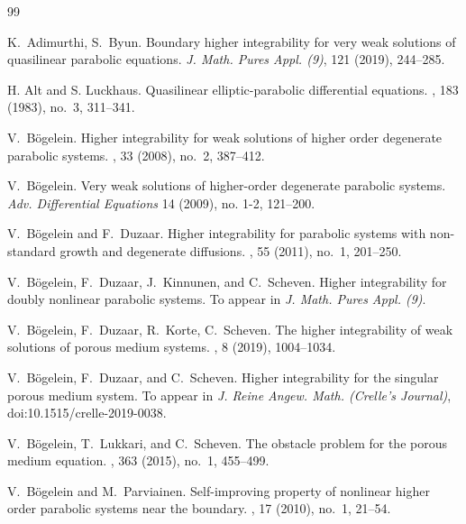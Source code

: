 \documentclass[a4paper, 10pt, american]{amsart}
\numberwithin{theorem}{section}
\numberwithin{equation}{section}
\begin{document}
   
   
   
\begin{thebibliography}{99}

  K.~Adimurthi, S.~Byun.
  \newblock Boundary higher integrability for very weak solutions of
  quasilinear parabolic equations.
  \newblock \emph{J. Math. Pures Appl. (9)}, 121 (2019), 244--285. 
  
\newblock H. Alt and S. Luckhaus.
\newblock Quasilinear elliptic-parabolic differential equations.
, 183 (1983), no.~3, 311--341.

\newblock V.~B\"ogelein.
\newblock Higher integrability for weak solutions of higher order degenerate parabolic systems. 
, 33 (2008), no.~2, 387--412.

\newblock V.~B\"ogelein.
\newblock Very weak solutions of higher-order degenerate parabolic
systems.
\newblock \emph{Adv. Differential Equations} 14 (2009), no. 1-2, 121--200.


\newblock V.~B\"ogelein and F.~Duzaar.
\newblock Higher integrability for parabolic systems with non-standard growth and degenerate diffusions. 
, 55 (2011), no.~1, 201--250.


\newblock V.~B\"ogelein, F.~Duzaar, J.~Kinnunen, and C.~Scheven.
\newblock Higher integrability for doubly nonlinear parabolic systems.
To appear in \emph{J. Math. Pures Appl. (9)}.


\newblock V.~B\"ogelein, F.~Duzaar, R.~Korte, C.~Scheven.
\newblock The higher integrability of weak solutions of porous medium systems. 
, 8 (2019), 1004--1034.

\newblock V.~B\"ogelein, F.~Duzaar, and C.~Scheven.
\newblock Higher integrability for the singular porous medium system.
\newblock To appear in \emph{J. Reine Angew. Math. (Crelle's Journal)},
doi:10.1515/crelle-2019-0038.

\newblock V.~B\"ogelein, T.~Lukkari, and C.~Scheven.
\newblock The obstacle problem for the porous medium equation.
, 363 (2015), no.~1, 455--499.


\newblock V.~B\"ogelein and M.~Parviainen.
\newblock Self-improving property of nonlinear higher order parabolic systems near the boundary. 
, 17 (2010), no.~1, 21--54.


\end{thebibliography}
\end{document}
